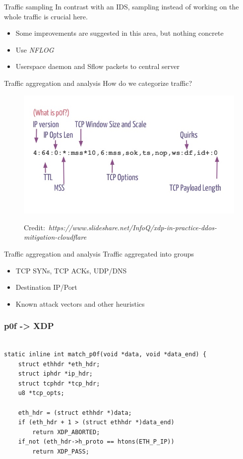 \documentclass{beamer}
\newcommand{\credit}[1]{\par\hfill \tiny Credit:~\itshape#1}
\begin{document}
\begin{frame}{Traffic sampling}
  In contrast with an IDS, sampling instead of working on the whole traffic is crucial here.
  \begin{itemize}
    \item Some improvements are suggested in this area, but nothing concrete
    \item Use \textit{NFLOG}
    \item Userspace daemon and Sflow packets to central server
  \end{itemize}
\end{frame}

\begin{frame}{Traffic aggregation and analysis}
  How do we categorize traffic?
  \pause
  \begin{figure}
    \includegraphics[width=\linewidth]{./p0f.jpg}
    \credit{https://www.slideshare.net/InfoQ/xdp-in-practice-ddos-mitigation-cloudflare}
  \end{figure}
\end{frame}

\begin{frame}{Traffic aggregation and analysis}
  Traffic aggregated into groups
  \begin{itemize}
    \item TCP SYNs, TCP ACKs, UDP/DNS
    \item Destination IP/Port
    \item Known attack vectors and other heuristics
  \end{itemize}
\end{frame}

\begin{frame}[fragile]
\frametitle{p0f -> XDP}
\begin{verbatim}

static inline int match_p0f(void *data, void *data_end) {
    struct ethhdr *eth_hdr;
    struct iphdr *ip_hdr;
    struct tcphdr *tcp_hdr;
    u8 *tcp_opts;

    eth_hdr = (struct ethhdr *)data;
    if (eth_hdr + 1 > (struct ethhdr *)data_end)
        return XDP_ABORTED;
    if_not (eth_hdr->h_proto == htons(ETH_P_IP))
        return XDP_PASS;


\end{verbatim}
\end{frame}
\end{document}
